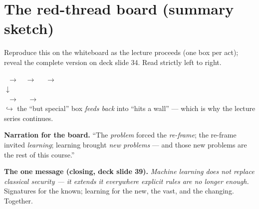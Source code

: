 \documentclass[11pt,a4paper]{article}
\begin{document}
\section{The red-thread board (summary sketch)}
Reproduce this on the whiteboard as the lecture proceeds (one box per act); reveal
the complete version on deck slide 34. Read strictly left to right.

\begin{center}
\footnotesize
{}~$\rightarrow$~~$\rightarrow$~%
~$\rightarrow$~\\[0.5em]
$\downarrow$\\[0.4em]
~$\rightarrow$~~%
$\rightarrow$~\\[0.5em]
{\color{bad}$\hookrightarrow$ the ``but special'' box \emph{feeds back} into
``hits a wall'' --- which is why the lecture series continues.}
\end{center}

\noindent\textbf{Narration for the board.} ``The \emph{problem} forced the
\emph{re-frame}; the re-frame invited \emph{learning}; learning brought
\emph{new problems} --- and those new problems are the rest of this course.''

\bigskip
\begin{note}
\textbf{The one message (closing, deck slide 39).} \emph{Machine learning does not
replace classical security --- it extends it everywhere explicit rules are no
longer enough.} Signatures for the known; learning for the new, the vast, and the
changing. Together.
\end{note}
\end{document}
